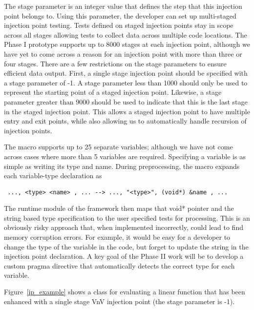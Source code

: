 The stage parameter is an integer value that defines the step that this injection point belongs to. Using this parameter, the developer can set up multi-staged injection point testing. Tests defined on staged injection points stay in scope across all stages allowing tests to collect data across multiple code locations. The Phase I prototype supports up to 8000 stages at each injection point, although we have yet to come across a reason for an injection point with more than three or four stages. There are a few restrictions on the stage parameters to ensure efficient data output. First, a single stage injection point should be specified with a stage parameter of -1. A stage parameter less than 1000 should only be used to represent the starting point of a staged injection point. Likewise, a stage parameter greater than 9000 should be used to indicate that this is the last stage in the staged injection point. This allows a staged injection point to have multiple entry and exit points, while also allowing us to automatically handle recursion of injection points.  

The macro supports up to 25 separate variables; although we have not come across cases where more than 5 variables are required. Specifying a variable is as simple 
as writing its type and name. During preprocessing, the macro expands each variable-type declaration as 
\begin{verbatim}
 ..., <type> <name> , ... --> ..., "<type>", (void*) &name , ... 
\end{verbatim}

The runtime module of the framework then maps that void* pointer and the string based type specification to the user specified tests for processing. This is an obviously risky approach that, when implemented incorrectly, could lead to find memory corruption errors. For example, it would be easy for a developer to change the type of the variable in the code, but forget to update the string in the injection point declaration. A key goal of the Phase II work will be to develop a custom pragma directive that automatically detects the correct type for each variable. 

Figure~\ref{ip_example} shows a class for evaluating a linear function that has been enhanced with a single stage VnV injection point (the stage parameter is -1). 

